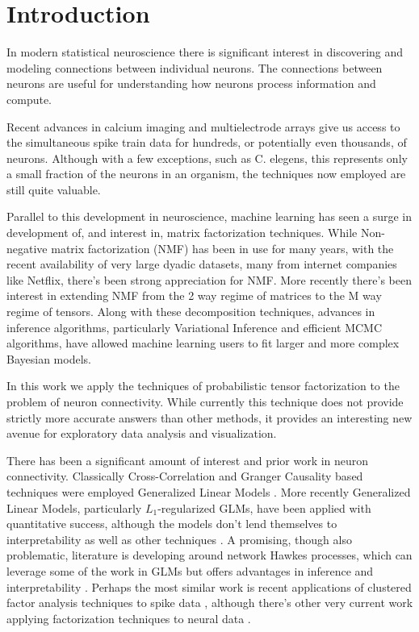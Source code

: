 \documentclass{article}
\begin{document}
\maketitle

\section{Introduction}
\label{sec:intro}
In modern statistical neuroscience there is significant interest in discovering and modeling connections between individual neurons. The connections between neurons are useful for understanding how neurons process information and compute.

Recent advances in calcium imaging and multielectrode arrays give us access to the simultaneous spike train data for hundreds, or potentially even thousands, of neurons. Although with a few exceptions, such as C. elegens, this represents only a small fraction of the neurons in an organism, the techniques now employed are still quite valuable.

Parallel to this development in neuroscience, machine learning has seen a surge in development of, and interest in, matrix factorization techniques. While Non-negative matrix factorization (NMF) has been in use for many years, with the recent availability of very large dyadic datasets, many from internet companies like Netflix, there's been strong appreciation for NMF. More recently there's been interest in extending NMF from the 2 way regime of matrices to the M way regime of tensors. Along with these decomposition techniques, advances in inference algorithms, particularly Variational Inference and efficient MCMC algorithms, have allowed machine learning users to fit larger and more complex Bayesian models.

In this work we apply the techniques of probabilistic tensor factorization to the problem of neuron connectivity. While currently this technique does not provide strictly more accurate answers than other methods, it provides an interesting new avenue for exploratory data analysis and visualization.  

There has been a significant amount of interest and prior work in neuron connectivity. Classically Cross-Correlation and Granger Causality based techniques were employed \cite{perkel1967neuronal,kaminski2001evaluating} Generalized Linear Models \cite{paninski2004maximum}.  More recently Generalized Linear Models,  particularly $L_1$-regularized GLMs, have been applied with quantitative success, although the models don't lend themselves to interpretability as well as other techniques \cite{paninski2004maximum,zhao20121}. A promising, though also problematic, literature is developing around network Hawkes processes, which can leverage some of the work in GLMs but offers advantages in inference and interpretability \cite{linderman2015scalable}. Perhaps the most similar work is recent applications of clustered factor analysis techniques to spike data \cite{buesing2014clustered}, although there's other very current work applying factorization techniques to neural data \cite{rudolph2015,friedrich2015}.
\end{document}

